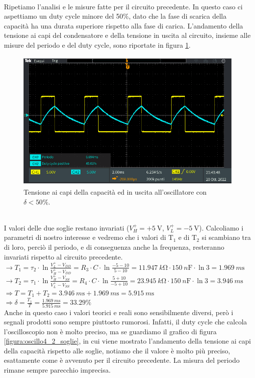 \documentclass{report}
\begin{document}
\\Ripetiamo l'analisi e le misure fatte per il circuito precedente. In questo caso ci aspettiamo un duty cycle minore del 50\%, dato che la fase di scarica della capacità ha una durata superiore rispetto alla fase di carica. L'andamento della tensione ai capi del condensatore e della tensione in uscita al circuito, insieme alle misure del periodo e del duty cycle, sono riportate in figura \ref{figura:oscillo4_2}.
\begin{figure}[h!]
	\centering
	\includegraphics[height=6.9cm]{immagini/TEK00034}
	\caption{Tensione ai capi della capacità ed in uscita all'oscillatore con $\delta<50\%$.}
	\label{figura:oscillo4_2}
\end{figure}
\\I valori delle due soglie restano invariati ($V_H^+=+\SI{5}{\volt}$, $V_L^+=\SI{-5}{\volt}$). Calcoliamo i parametri di nostro interesse e vedremo che i valori di $\mathrm{T_1}$ e di $\mathrm{T_2}$ si scambiano tra di loro, perciò il periodo, e di conseguenza anche la frequenza, resteranno invariati rispetto al circuito precedente. 
\\[4pt]\indent$\rightarrow\displaystyle{T_1=\tau_2\cdot\ln\frac{V_L^+-V_{DD}}{V_H^+-V_{DD}}=R_3\cdot C\cdot\ln\frac{-5-10}{5-10}=\SI{11.947}{k\ohm}\cdot\SI{150}{n\farad}\cdot\ln3}=\SI{1.969}{m\second}$
\\[6pt]\indent$\rightarrow\displaystyle{T_2=\tau_1\cdot\ln\frac{V_H^+-V_{SS}}{V_L^+-V_{SS}}=R_4\cdot C\cdot\ln\frac{5+10}{-5+10}=\SI{23.945}{k\ohm}\cdot\SI{150}{n\farad}\cdot\ln3}=\SI{3.946}{m\second}$
\\[6pt]\indent$\Rightarrow\displaystyle{T=T_1+T_2=\SI{3.946}{m\second}+\SI{1.969}{m\second}=\SI{5.915}{m\second}}$
\\[6pt]\indent$\Rightarrow\displaystyle{\delta=\frac{T_1}{T}=\frac{\SI{1.969}{m\second}}{\SI{5.915}{m\second}}= 33.29\%}$
\\[4pt]Anche in questo caso i valori teorici e reali sono sensibilmente diversi, però i segnali prodotti sono sempre piuttosto rumorosi. Infatti, il duty cycle che calcola l'oscilloscopio non è molto preciso, ma se guardiamo il grafico di figura \ref{figura:oscillo4_2_soglie}, in cui viene mostrato l'andamento della tensione ai capi della capacità rispetto alle soglie, notiamo che il valore è molto più preciso, esattamente come è avvenuto per il circuito precedente. La misura del periodo rimane sempre parecchio imprecisa.
\end{document}
